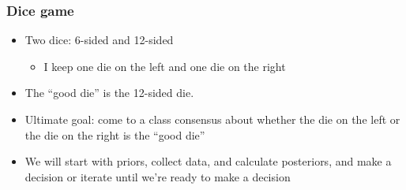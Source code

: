\documentclass[slidestop,compress,mathserif,12pt,t,professionalfonts,xcolor=table]{beamer}
\begin{document}
\begin{frame}
\frametitle{Dice game}

\begin{itemize}

\item Two dice: 6-sided and 12-sided
\begin{itemize}
\item I keep one die on the left and one die on the right
\end{itemize}

\pause

\item The ``good die'' is the 12-sided die.

\pause

\item Ultimate goal: come to a class consensus about whether the die on the left or the die on the right is the ``good die''

\pause

\item We will start with priors, collect data, and calculate posteriors, and make a decision or iterate until we're ready to make a decision

\end{itemize}


\end{frame}

\end{document}
